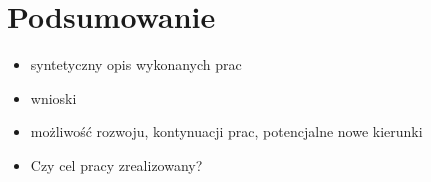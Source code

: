 \documentclass[a4paper,twoside,12pt]{book}
\newcounter{stronyPozaNumeracja}
\begin{document}
\chapter{Podsumowanie}
\begin{itemize}
\item syntetyczny opis wykonanych prac
\item wnioski
\item możliwość rozwoju, kontynuacji prac, potencjalne nowe kierunki
\item Czy cel pracy zrealizowany? 
\end{itemize}


\backmatter
{}
\setcounter{page}{\value{stronyPozaNumeracja}}

\pagestyle{tylkoNumeryStron}



\end{document}
